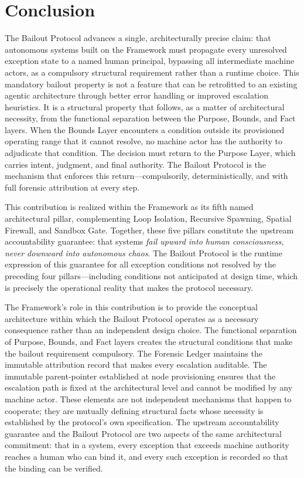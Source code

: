 \section{Conclusion}\label{sec:conclusion}

The Bailout Protocol advances a single, architecturally precise claim: that autonomous systems built on the \bxthree{} Framework must propagate every unresolved exception state to a named human principal, bypassing all intermediate machine actors, as a compulsory structural requirement rather than a runtime choice. This mandatory bailout property is not a feature that can be retrofitted to an existing agentic architecture through better error handling or improved escalation heuristics. It is a structural property that follows, as a matter of architectural necessity, from the functional separation between the Purpose, Bounds, and Fact layers. When the Bounds Layer encounters a condition outside its provisioned operating range that it cannot resolve, no machine actor has the authority to adjudicate that condition. The decision must return to the Purpose Layer, which carries intent, judgment, and final authority. The Bailout Protocol is the mechanism that enforces this return---compulsorily, deterministically, and with full forensic attribution at every step.

This contribution is realized within the \bxthree{} Framework as its fifth named architectural pillar, complementing Loop Isolation, Recursive Spawning, Spatial Firewall, and Sandbox Gate. Together, these five pillars constitute the upstream accountability guarantee: that \bxthree{} systems \emph{fail upward into human consciousness, never downward into autonomous chaos}. The Bailout Protocol is the runtime expression of this guarantee for all exception conditions not resolved by the preceding four pillars---including conditions not anticipated at design time, which is precisely the operational reality that makes the protocol necessary.

The \bxthree{} Framework's role in this contribution is to provide the conceptual architecture within which the Bailout Protocol operates as a necessary consequence rather than an independent design choice. The functional separation of Purpose, Bounds, and Fact layers creates the structural conditions that make the bailout requirement compulsory. The Forensic Ledger maintains the immutable attribution record that makes every escalation auditable. The immutable parent-pointer established at node provisioning ensures that the escalation path is fixed at the architectural level and cannot be modified by any machine actor. These elements are not independent mechanisms that happen to cooperate; they are mutually defining structural facts whose necessity is established by the protocol's own specification. The upstream accountability guarantee and the Bailout Protocol are two aspects of the same architectural commitment: that in a \bxthree{} system, every exception that exceeds machine authority reaches a human who can bind it, and every such exception is recorded so that the binding can be verified.


